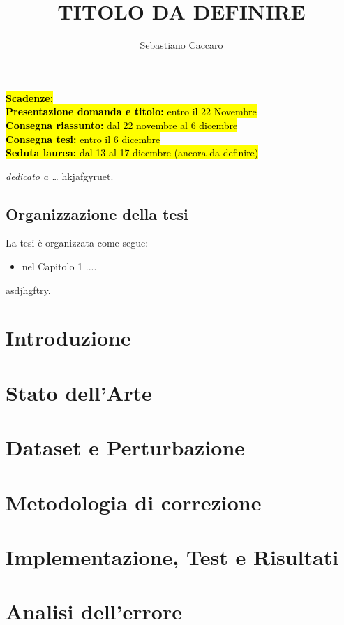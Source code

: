 \documentclass[a4paper,12pt]{report}
\begin{document}
\newcommand{\E}{È}
\noindent
\hl{\textbf{Scadenze:}\\
\textbf{Presentazione domanda e titolo:} entro il 22 Novembre\\
\textbf{Consegna riassunto:} dal 22 novembre al 6 dicembre\\
\textbf{Consegna tesi:} entro il 6 dicembre\\
\textbf{Seduta laurea:} dal 13 al 17 dicembre (ancora da definire)
}
\title{TITOLO DA DEFINIRE}
\author{Sebastiano Caccaro}
%
% 
%
\beforepreface
\prefacesection{}
        {\hfill \Large {\sl dedicato a \dots}}
% 
%
hkjafgyruet.
%
%
\section*{Organizzazione della tesi}
\label{organizzazione}
La tesi \`e organizzata come segue:
\begin{itemize}
\item nel Capitolo 1 ....
\end{itemize}
%
%
asdjhgftry.
\afterpreface
% 
% 
\chapter{Introduzione}
\label{sec:intro}

\chapter{Stato dell'Arte}
\label{sec:arte}


\chapter{Dataset e Perturbazione}
\label{sec:dataset}

\chapter{Metodologia di correzione}
\label{sec:metodologia}


\chapter{Implementazione, Test e Risultati}
\label{sec:test}

\chapter{Analisi dell'errore}
\label{sec:analisi}








\end{document}
